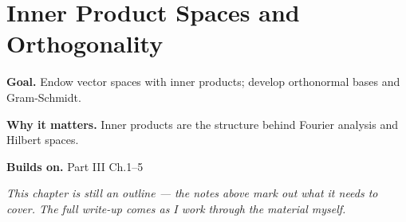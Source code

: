 \chapter{Inner Product Spaces and Orthogonality}
\label{ch:03-linear-algebra-06}

\begin{chapterintro}
\textbf{Goal.} Endow vector spaces with inner products; develop orthonormal bases and Gram-Schmidt.

\textbf{Why it matters.} Inner products are the structure behind Fourier analysis and Hilbert spaces.

\textbf{Builds on.} Part III Ch.1–5
\end{chapterintro}

\textit{This chapter is still an outline --- the notes above mark out what it needs to cover. The full write-up comes as I work through the material myself.}

